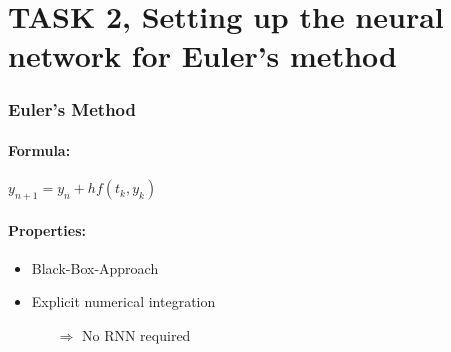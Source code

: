 \section{TASK 2, Setting up the neural network for Euler's method}

\begin{frame}
	\frametitle{Euler's Method}
	\paragraph{Formula:}\vspace{-1mm}
	\quad\quad $y_{n+1} = y_n + h f(t_k,y_k)$
	\vspace{5mm}
	
	\paragraph{Properties:}\vspace{-2mm}
	\begin{itemize}
		\item Black-Box-Approach
		\item Explicit numerical integration
		\begin{itemize}
			\item[$\Rightarrow$] No RNN required
		\end{itemize}
	\end{itemize}
\end{frame}


